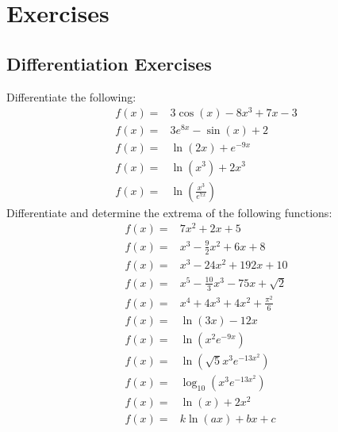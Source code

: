 \documentclass[main.tex]{subfiles}
\begin{document}
\section{Exercises}
\subsection{Differentiation Exercises}
Differentiate the following:
\begin{align}
f(x) =& 3 \cos(x)-8x^3+7x-3\\
f(x) =& 3e^{8x}-\sin(x)+2\\
f(x) =& \ln(2x) + e^{-9x}\\
f(x) =& \ln(x^3)+2x^3\\
f(x) =& \ln\left(\frac{x^3}{e^{7x}}\right)
\end{align}
Differentiate and determine the extrema of the following functions:
\begin{align}
f(x) =& 7x^2+2x+5\\
f(x) =& x^3-\frac{9}{2}x^2+6x+8\\
f(x) =& x^3-24x^2+192x+10\\
f(x) =& x^5-\frac{10}{3}x^3-75x+\sqrt{2}\\
f(x) =& x^4+4x^3+4x^2+\frac{\pi^2}{6}\\
f(x) =& \ln(3x)-12x\\
f(x) =& \ln(x^2e^{-9x})\\
f(x) =& \ln(\sqrt{5}x^3e^{-13x^2})\\
f(x) =& \log_{10}(x^3e^{-13x^2})\\
f(x) =& \ln(x) + 2x^2\\
f(x) =& k\ln(ax) + bx+c
\end{align}
\end{document}
